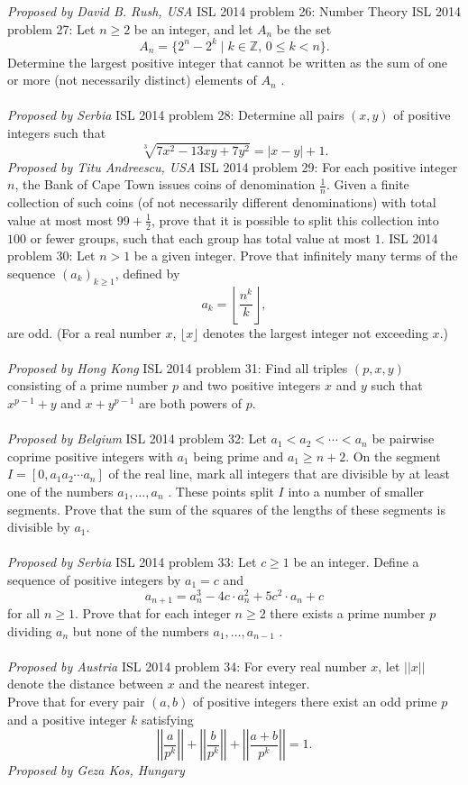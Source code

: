 \textit{Proposed by David B. Rush, USA} 
ISL 2014 problem 26:  Number Theory 
ISL 2014 problem 27:  Let $n \ge 2$ be an integer, and let $A_n$ be the set
\[ A_n = \{2^n  - 2^k\mid k \in \mathbb{Z},\, 0 \le k < n\}. \]
Determine the largest positive integer that cannot be written as the sum of one or more (not necessarily distinct) elements of $A_n$ . \\\\
\textit{Proposed by Serbia} 
ISL 2014 problem 28:  Determine all pairs $(x, y)$ of positive integers such that
\[ \sqrt[3]{7x^2-13xy+7y^2}=|x-y|+1. \]
\textit{Proposed by Titu Andreescu, USA} 
ISL 2014 problem 29:  For each positive integer $n$, the Bank of Cape Town issues coins of denomination $\frac1n$. Given a finite collection of such coins (of not necessarily different denominations) with total value at most most $99+\frac12$, prove that it is possible to split this collection into $100$ or fewer groups, such that each group has total value at most $1$. 
ISL 2014 problem 30:  Let $n > 1$ be a given integer. Prove that infinitely many terms of the sequence $(a_k )_{k\ge 1}$, defined by
\[ a_k=\left\lfloor\frac{n^k}{k}\right\rfloor, \]
are odd. (For a real number $x$, $\lfloor x\rfloor$ denotes the largest integer not exceeding $x$.) \\\\
\textit{Proposed by Hong Kong} 
ISL 2014 problem 31:  Find all triples $(p, x, y)$ consisting of a prime number $p$ and two positive integers $x$ and $y$ such that $x^{p -1} + y$ and $x + y^ {p -1}$ are both powers of $p$. \\\\
\textit{Proposed by Belgium} 
ISL 2014 problem 32:  Let $a_1 < a_2 <  \cdots <a_n$ be pairwise coprime positive integers with $a_1$ being prime and $a_1 \ge n + 2$. On the segment $I = [0, a_1 a_2  \cdots a_n ]$ of the real line, mark all integers that are divisible by at least one of the numbers $a_1 ,   \ldots , a_n$ . These points split $I$ into a number of smaller segments. Prove that the sum of the squares of the lengths of these segments is divisible by $a_1$. \\\\
\textit{Proposed by Serbia} 
ISL 2014 problem 33:  Let $c \ge 1$ be an integer. Define a sequence of positive integers by $a_1 = c$ and
\[ a_{n+1}=a_n^3-4c\cdot a_n^2+5c^2\cdot a_n+c \]
for all $n\ge 1$. Prove that for each integer $n \ge 2$ there exists a prime number $p$ dividing $a_n$ but none of the numbers $a_1 , \ldots , a_{n -1}$ . \\\\
\textit{Proposed by Austria} 
ISL 2014 problem 34:  For every real number $x$, let $||x||$ denote the distance between $x$ and the nearest integer. \\
Prove that for every pair $(a, b)$ of positive integers there exist an odd prime $p$ and a positive integer $k$ satisfying
\[
\displaystyle\left|\left|\frac{a}{p^k}\right|\right|+\left|\left|\frac{b}{p^k}\right|\right|+\left|\left|\frac{a+b}{p^k}\right|\right|=1.
\]
\textit{Proposed by Geza Kos, Hungary} 

